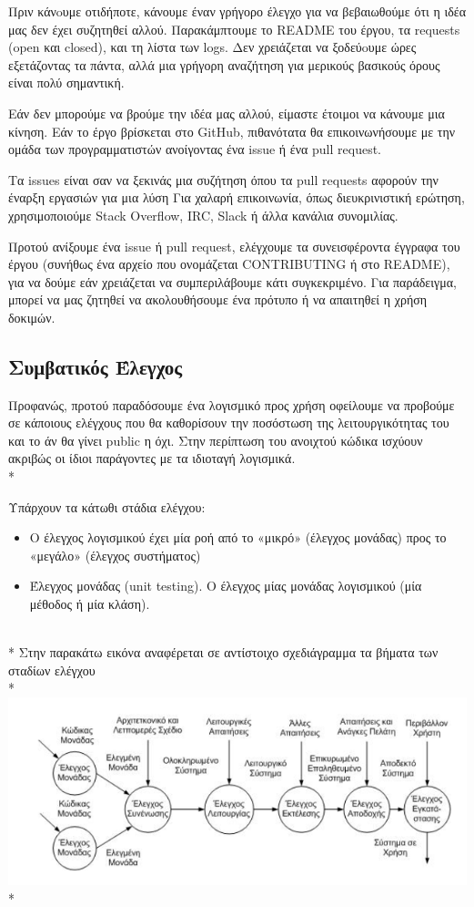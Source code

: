 \documentclass[a4paper, 11pt]{article}
\begin{document}
{{Πριν κάνoυμε οτιδήποτε, κάνουμε έναν γρήγορο έλεγχο για να βεβαιωθούμε ότι η ιδέα μας δεν έχει συζητηθεί αλλού. Παρακάμπτουμε το \textlatin{README} του έργου, τα \textlatin{requests (open και closed)}, και τη λίστα των \textlatin{logs}. Δεν χρειάζεται να ξοδεύoυμε ώρες εξετάζοντας τα πάντα, αλλά μια γρήγορη αναζήτηση για μερικούς βασικούς όρους είναι πολύ σημαντική.

Εάν δεν μπορούμε να βρούμε την ιδέα μας αλλού, είμαστε έτοιμοι να κάνουμε μια κίνηση. Εάν το έργο βρίσκεται στο \textlatin{GitHub}, πιθανότατα θα επικοινωνήσουμε με την ομάδα των προγραμματιστών  ανοίγοντας ένα issue ή ένα pull request.

    Τα issues είναι σαν να ξεκινάς μια συζήτηση όπου
    τα \textlatin{pull requests}  αφορούν την έναρξη εργασιών για μια λύση
    Για χαλαρή επικοινωνία, όπως διευκρινιστική ερώτηση, χρησιμοποιούμε  \textlatin{Stack Overflow, IRC, Slack ή άλλα κανάλια συνομιλίας}.

Προτού ανίξουμε ένα \textlatin{issue} ή \textlatin{pull request}, ελέγχουμε τα συνεισφέροντα έγγραφα του έργου (συνήθως ένα αρχείο που ονομάζεται \textlatin{CONTRIBUTING} ή στο \textlatin{README}), για να δούμε εάν χρειάζεται να συμπεριλάβουμε κάτι συγκεκριμένο. Για παράδειγμα, μπορεί να μας ζητηθεί να ακολουθήσουμε ένα πρότυπο ή να απαιτηθεί η χρήση δοκιμών.

\subsection{Συμβατικός Έλεγχος}
Προφανώς, προτού παραδόσουμε ένα λογισμικό προς χρήση οφείλουμε να προβούμε σε κάποιους ελέγχους που θα καθορίσουν την ποσόστωση της λειτουργικότητας του και το άν θα γίνει \textlatin{public} η όχι. Στην περίπτωση του ανοιχτού κώδικα ισχύουν ακριβώς οι ίδιοι παράγοντες με τα ιδιοταγή λογισμικά.\\*

Υπάρχουν τα κάτωθι στάδια ελέγχου:
\begin{itemize}
\item Ο έλεγχος λογισμικού έχει μία ροή από το «μικρό» (έλεγχος
μονάδας) προς το «μεγάλο» (έλεγχος συστήματος)
\item Έλεγχος μονάδας (\textlatin{unit testing}). Ο έλεγχος μίας μονάδας
λογισμικού (μία μέθοδος ή μία κλάση).
\end{itemize}
\\*
Στην παρακάτω εικόνα αναφέρεται σε αντίστοιχο σχεδιάγραμμα τα βήματα των σταδίων ελέγχου\\*
\includegraphics{images/control.png}\\*
}}
\end{document}
